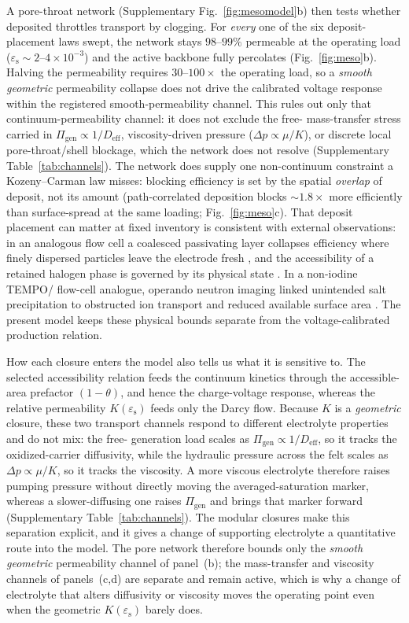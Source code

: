 \documentclass[11pt]{article}
\newcommand{\epss}{\varepsilon_{\mathrm{s}}}
\newcommand{\Deff}{D_{\mathrm{eff}}}
\begin{document}
A pore-throat network (Supplementary Fig.~\ref{fig:mesomodel}b) then tests whether deposited  throttles transport by clogging. For \emph{every}
one of the six deposit-placement laws swept, the network stays $98$--$99\%$ permeable at the operating load
($\epss\sim2$--$4\times10^{-3}$) and the active backbone fully percolates (Fig.~\ref{fig:meso}b). Halving
the permeability requires $30$--$100\times$ the operating load, so a \emph{smooth geometric} permeability
collapse does not drive the calibrated voltage response within the registered smooth-permeability channel.
This rules out only that continuum-permeability
channel: it does not exclude the free- mass-transfer stress carried in
$\Pi_{\mathrm{gen}}\propto1/\Deff$, viscosity-driven pressure ($\Delta p\propto\mu/K$), or discrete local
pore-throat/shell blockage, which the network does not resolve (Supplementary Table~\ref{tab:channels}). The network does supply one non-continuum constraint a Kozeny--Carman law misses:
blocking efficiency is set by the spatial \emph{overlap} of deposit, not its amount (path-correlated
deposition blocks $\sim\!1.8\times$ more efficiently than surface-spread at the same loading;
Fig.~\ref{fig:meso}c). That deposit placement can matter at fixed inventory is consistent with external
observations: in an analogous flow cell a coalesced passivating layer collapses
efficiency where finely dispersed particles leave the electrode fresh \citep{ZnMnEES2025}, and the
accessibility of a retained halogen phase is governed by its physical state \citep{XuZnBr2024}. In a
non-iodine TEMPO/ flow-cell analogue, operando neutron imaging linked unintended salt precipitation
to obstructed ion transport and reduced available surface area \citep{RFB_SEF2025}. The present model keeps these physical
bounds separate from the voltage-calibrated production relation.

How each closure enters the model also tells us what it is sensitive to. The selected accessibility relation feeds the
continuum kinetics through the accessible-area prefactor $(1-\theta)$, and hence the charge-voltage
response, whereas the relative permeability $K(\epss)$ feeds only the Darcy flow. Because $K$ is a
\emph{geometric} closure, these two transport channels respond to different electrolyte properties and do not
mix: the free- generation load scales as $\Pi_{\mathrm{gen}}\propto1/\Deff$, so it tracks the
oxidized-carrier diffusivity, while the hydraulic pressure across the felt scales as $\Delta p\propto\mu/K$,
so it tracks the viscosity. A more viscous electrolyte therefore raises pumping pressure without directly
moving the averaged-saturation marker, whereas a slower-diffusing one raises $\Pi_{\mathrm{gen}}$ and brings
that marker forward (Supplementary Table~\ref{tab:channels}). The modular closures make this separation explicit, and it gives
a change of supporting electrolyte a quantitative route into the model. The pore network therefore bounds
only the \emph{smooth geometric} permeability channel of panel~(b); the mass-transfer and viscosity channels
of panels~(c,d) are separate and remain active, which is why a change of electrolyte that alters diffusivity
or viscosity moves the operating point even when the geometric $K(\epss)$ barely does.
\end{document}
